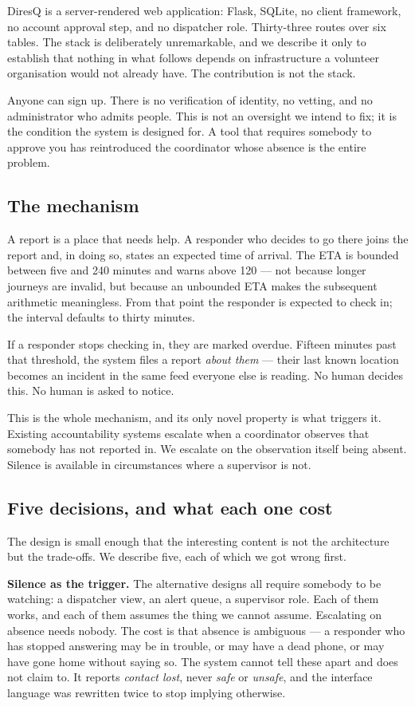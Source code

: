 DiresQ is a server-rendered web application: Flask, SQLite, no client
framework, no account approval step, and no dispatcher role.
Thirty-three routes over six tables. The stack is deliberately
unremarkable, and we describe it only to establish that nothing in what
follows depends on infrastructure a volunteer organisation would not
already have. The contribution is not the stack.

Anyone can sign up. There is no verification of identity, no vetting,
and no administrator who admits people. This is not an oversight we
intend to fix; it is the condition the system is designed for. A tool
that requires somebody to approve you has reintroduced the coordinator
whose absence is the entire problem.

\subsection{The mechanism}

A report is a place that needs help. A responder who decides to go there
joins the report and, in doing so, states an expected time of arrival.
The ETA is bounded between five and 240 minutes and warns above 120 ---
not because longer journeys are invalid, but because an unbounded ETA
makes the subsequent arithmetic meaningless. From that point the
responder is expected to check in; the interval defaults to thirty
minutes.

If a responder stops checking in, they are marked overdue. Fifteen
minutes past that threshold, the system files a report \emph{about them}
--- their last known location becomes an incident in the same feed
everyone else is reading. No human decides this. No human is asked to
notice.

This is the whole mechanism, and its only novel property is what
triggers it. Existing accountability systems escalate when a coordinator
observes that somebody has not reported in. We escalate on the
observation itself being absent. Silence is available in circumstances
where a supervisor is not.

\subsection{Five decisions, and what each one cost}

The design is small enough that the interesting content is not the
architecture but the trade-offs. We describe five, each of which we got
wrong first.

\textbf{Silence as the trigger.} The alternative designs all require
somebody to be watching: a dispatcher view, an alert queue, a supervisor
role. Each of them works, and each of them assumes the thing we cannot
assume. Escalating on absence needs nobody. The cost is that absence is
ambiguous --- a responder who has stopped answering may be in trouble,
or may have a dead phone, or may have gone home without saying so. The
system cannot tell these apart and does not claim to. It reports
\emph{contact lost}, never \emph{safe} or \emph{unsafe}, and the
interface language was rewritten twice to stop implying otherwise.


